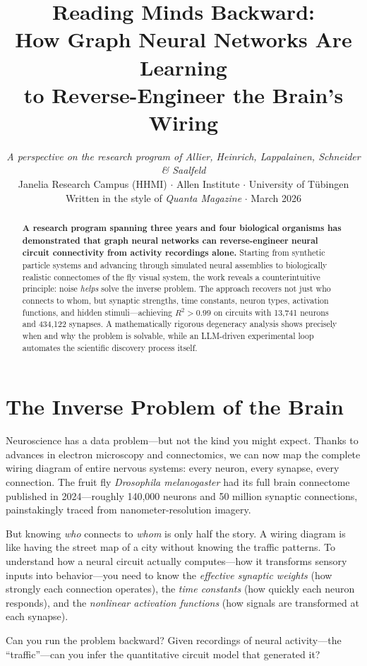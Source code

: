 \documentclass[11pt,twocolumn]{article}
\title{\vspace{-1cm}\textbf{\color{quantablue}Reading Minds Backward:\\[4pt] How Graph Neural Networks Are Learning\\[2pt] to Reverse-Engineer the Brain's Wiring}}
\author{%
\textit{A perspective on the research program of Allier, Heinrich, Lappalainen, Schneider \& Saalfeld}\\[2pt]
\small Janelia Research Campus (HHMI) $\cdot$ Allen Institute $\cdot$ University of T\"ubingen\\[6pt]
\small\color{gray} Written in the style of \textit{Quanta Magazine} $\cdot$ March 2026%
}
\date{}
\begin{document}
\maketitle
\thispagestyle{fancy}

\begin{abstract}
\noindent
\textbf{A research program spanning three years and four biological organisms has demonstrated that graph neural networks can reverse-engineer neural circuit connectivity from activity recordings alone.} Starting from synthetic particle systems and advancing through simulated neural assemblies to biologically realistic connectomes of the fly visual system, the work reveals a counterintuitive principle: noise \emph{helps} solve the inverse problem. The approach recovers not just who connects to whom, but synaptic strengths, time constants, neuron types, activation functions, and hidden stimuli---achieving $R^2 > 0.99$ on circuits with 13,741 neurons and 434,122 synapses. A mathematically rigorous degeneracy analysis shows precisely when and why the problem is solvable, while an LLM-driven experimental loop automates the scientific discovery process itself.
\end{abstract}

\section{The Inverse Problem of the Brain}

Neuroscience has a data problem---but not the kind you might expect. Thanks to advances in electron microscopy and connectomics, we can now map the complete wiring diagram of entire nervous systems: every neuron, every synapse, every connection. The fruit fly \textit{Drosophila melanogaster} had its full brain connectome published in 2024---roughly 140,000 neurons and 50 million synaptic connections, painstakingly traced from nanometer-resolution imagery.

But knowing \emph{who} connects to \emph{whom} is only half the story. A wiring diagram is like having the street map of a city without knowing the traffic patterns. To understand how a neural circuit actually computes---how it transforms sensory inputs into behavior---you need to know the \emph{effective synaptic weights} (how strongly each connection operates), the \emph{time constants} (how quickly each neuron responds), and the \emph{nonlinear activation functions} (how signals are transformed at each synapse).

Can you run the problem backward? Given recordings of neural activity---the ``traffic''---can you infer the quantitative circuit model that generated it?
\end{document}
